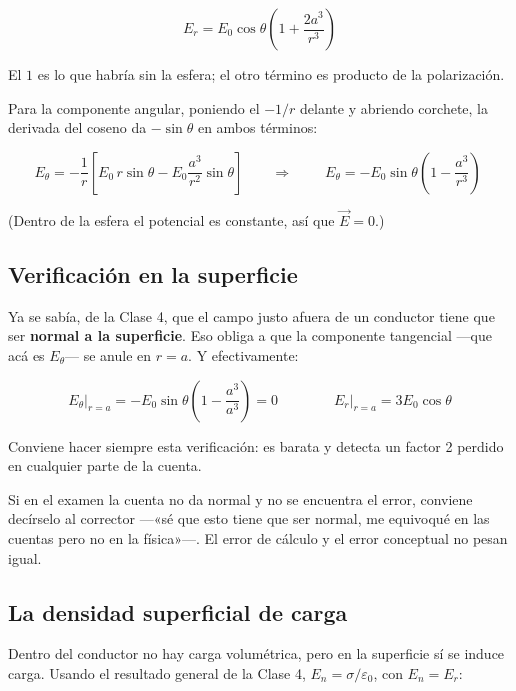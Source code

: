 \documentclass[12pt,a4paper]{article}
\begin{document}
\[
\boxed{\;E_r = E_0\cos\theta\left(1 + \frac{2a^3}{r^3}\right)\;}
\]

El $1$ es lo que habría sin la esfera; el otro término es producto de la
polarización.

Para la componente angular, poniendo el $-1/r$ delante y abriendo corchete, la
derivada del coseno da $-\sin\theta$ en ambos términos:

\[
E_\theta = -\frac{1}{r}\left[E_0\,r\sin\theta - E_0\frac{a^3}{r^2}\sin\theta\right]
\qquad\Longrightarrow\qquad
\boxed{\;E_\theta = -E_0\sin\theta\left(1 - \frac{a^3}{r^3}\right)\;}
\]

(Dentro de la esfera el potencial es constante, así que $\vec E = 0$.)

\subsection{Verificación en la superficie}

Ya se sabía, de la Clase 4, que el campo justo afuera de un conductor tiene que
ser \textbf{normal a la superficie}. Eso obliga a que la componente tangencial
---que acá es $E_\theta$--- se anule en $r=a$. Y efectivamente:

\[
E_\theta\big|_{r=a} = -E_0\sin\theta\left(1 - \frac{a^3}{a^3}\right) = 0
\qquad\qquad
E_r\big|_{r=a} = 3E_0\cos\theta
\]

\begin{keybox}
Conviene hacer siempre esta verificación: es barata y detecta un factor 2 perdido
en cualquier parte de la cuenta.
\end{keybox}

\begin{notebox}
Si en el examen la cuenta no da normal y no se encuentra el error, conviene
decírselo al corrector ---«sé que esto tiene que ser normal, me equivoqué en las
cuentas pero no en la física»---. El error de cálculo y el error conceptual no
pesan igual.
\end{notebox}

\subsection{La densidad superficial de carga}

Dentro del conductor no hay carga volumétrica, pero en la superficie sí se induce
carga. Usando el resultado general de la Clase 4, $E_n = \sigma/\varepsilon_0$,
con $E_n = E_r$:
\end{document}
